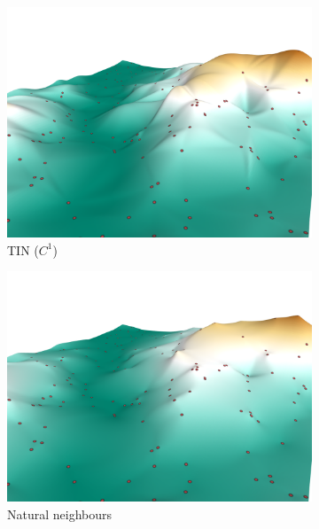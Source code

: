 \begin{figure}
\begin{subfigure}[b]{0.41\linewidth}
    \includegraphics{figs/results/tin_c1.png}
    \caption{TIN ($C^1$)}
  \end{subfigure}
  \quad
  \begin{subfigure}[b]{0.41\linewidth}
    \centering
    \includegraphics{figs/results/nni.png}
    \caption{Natural neighbours}
  \end{subfigure}  
  \quad
  \begin{subfigure}[b]{0.41\linewidth}
    \centering

\end{subfigure}
\end{figure}
